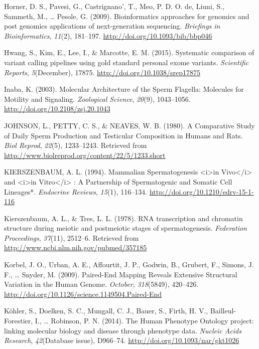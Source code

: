 \documentclass[12pt,twoside]{reedthesis}
\theoremstyle{definition}
\theoremstyle{definition}
\theoremstyle{remark}
\begin{document}
  \hypertarget{ref-Horner2009}{}
  Horner, D. S., Pavesi, G., Castrignano', T., Meo, P. D. O. de, Liuni,
  S., Sammeth, M., \ldots{} Pesole, G. (2009). Bioinformatics approaches
  for genomics and post genomics applications of next-generation
  sequencing. \emph{Briefings in Bioinformatics}, \emph{11}(2), 181--197.
  \url{http://doi.org/10.1093/bib/bbp046}
  
  \hypertarget{ref-Hwang2015}{}
  Hwang, S., Kim, E., Lee, I., \& Marcotte, E. M. (2015). Systematic
  comparison of variant calling pipelines using gold standard personal
  exome variants. \emph{Scientific Reports}, \emph{5}(December), 17875.
  \url{http://doi.org/10.1038/srep17875}
  
  \hypertarget{ref-Inaba2003}{}
  Inaba, K. (2003). Molecular Architecture of the Sperm Flagella:
  Molecules for Motility and Signaling. \emph{Zoological Science},
  \emph{20}(9), 1043--1056. \url{http://doi.org/10.2108/zsj.20.1043}
  
  \hypertarget{ref-Johnson1980}{}
  JOHNSON, L., PETTY, C. S., \& NEAVES, W. B. (1980). A Comparative Study
  of Daily Sperm Production and Testicular Composition in Humans and Rats.
  \emph{Biol Reprod}, \emph{22}(5), 1233--1243. Retrieved from
  \url{http://www.biolreprod.org/content/22/5/1233.short}
  
  \hypertarget{ref-KIERSZENBAUM1994}{}
  KIERSZENBAUM, A. L. (1994). Mammalian Spermatogenesis
  \textless{}i\textgreater{}in Vivo\textless{}/i\textgreater{} and
  \textless{}i\textgreater{}in Vitro\textless{}/i\textgreater{} : A
  Partnership of Spermatogenic and Somatic Cell Lineages*. \emph{Endocrine
  Reviews}, \emph{15}(1), 116--134.
  \url{http://doi.org/10.1210/edrv-15-1-116}
  
  \hypertarget{ref-Kierszenbaum1978}{}
  Kierszenbaum, A. L., \& Tres, L. L. (1978). RNA transcription and
  chromatin structure during meiotic and postmeiotic stages of
  spermatogenesis. \emph{Federation Proceedings}, \emph{37}(11), 2512--6.
  Retrieved from \url{http://www.ncbi.nlm.nih.gov/pubmed/357185}
  
  \hypertarget{ref-Korbel2009}{}
  Korbel, J. O., Urban, A. E., Affourtit, J. P., Godwin, B., Grubert, F.,
  Simons, J. F., \ldots{} Snyder, M. (2009). Paired-End Mapping Reveals
  Extensive Structural Variation in the Human Genome. \emph{October},
  \emph{318}(5849), 420--426.
  \url{http://doi.org/10.1126/science.1149504.Paired-End}
  
  \hypertarget{ref-Kohler2014}{}
  Köhler, S., Doelken, S. C., Mungall, C. J., Bauer, S., Firth, H. V.,
  Bailleul-Forestier, I., \ldots{} Robinson, P. N. (2014). The Human
  Phenotype Ontology project: linking molecular biology and disease
  through phenotype data. \emph{Nucleic Acids Research},
  \emph{42}(Database issue), D966--74.
  \url{http://doi.org/10.1093/nar/gkt1026}
  
\end{document}
